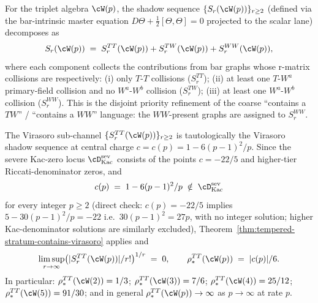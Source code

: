\begin{definition}
\label{def:wp-shadow-channel-decomposition}
For the triplet algebra $\cW(p)$, the shadow sequence
$\{S_r(\cW(p))\}_{r \ge 2}$ (defined via the bar-intrinsic master
equation $D \Theta + \frac{1}{2}[\Theta, \Theta] = 0$ projected to the
scalar lane) decomposes as
\[
 S_r(\cW(p)) \;=\;
 S_r^{TT}(\cW(p)) + S_r^{TW}(\cW(p)) + S_r^{WW}(\cW(p)),
\]
where each component collects the contributions from bar graphs whose
r-matrix collisions are respectively: (i) only $T$-$T$ collisions
($S_r^{TT}$); (ii) at least one $T$-$W^a$ primary-field collision and
no $W^a$-$W^b$ collision ($S_r^{TW}$); (iii) at least one
$W^a$-$W^b$ collision ($S_r^{WW}$). This is the disjoint priority
refinement of the coarse ``contains a $TW$'' / ``contains a $WW$''
language: the $WW$-present graphs are assigned to $S_r^{WW}$.
\end{definition}

\begin{lemma}
\label{lem:wp-virasoro-subchannel-tempered}
The Virasoro sub-channel $\{S_r^{TT}(\cW(p))\}_{r \ge 2}$ is
tautologically the Virasoro shadow sequence at central charge
$c = c(p) = 1 - 6(p-1)^2/p$. Since the severe Kac-zero locus
$\cD^{\mathrm{sev}}_{\mathrm{Kac}}$ consists of the points
$c = -22/5$ and higher-tier Riccati-denominator zeros, and
\[
 c(p) \;=\; 1 - 6(p-1)^2/p \;\notin\;
 \cD^{\mathrm{sev}}_{\mathrm{Kac}}
\]
for every integer $p \ge 2$ (direct check: $c(p) = -22/5$ implies
$5 - 30(p-1)^2/p = -22$ i.e.\ $30(p-1)^2 = 27 p$, with no integer
solution; higher Kac-denominator solutions are similarly excluded),
Theorem~\ref{thm:tempered-stratum-contains-virasoro} applies and
\[
 \limsup_{r \to \infty}
 \bigl( \lvert S_r^{TT}(\cW(p)) \rvert / r! \bigr)^{1/r} \;=\; 0,
 \qquad
 \rho_*^{TT}(\cW(p)) \;=\; \lvert c(p) \rvert / 6.
\]
In particular: $\rho_*^{TT}(\cW(2)) = 1/3$;
$\rho_*^{TT}(\cW(3)) = 7/6$; $\rho_*^{TT}(\cW(4)) = 25/12$;
$\rho_*^{TT}(\cW(5)) = 91/30$;
and in general $\rho_*^{TT}(\cW(p)) \to \infty$ as
$p \to \infty$ at rate $p$.
\end{lemma}

